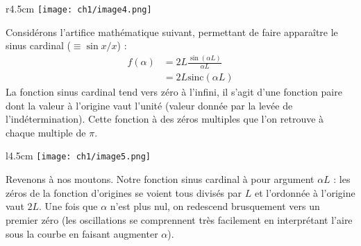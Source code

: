 \begin{wrapfigure}[8]{r}{4.5cm}
\vspace{-5mm}
\texttt{[image: ch1/image4.png]}
\end{wrapfigure}
Considérons l'artifice mathématique suivant, permettant de faire apparaître le 
sinus cardinal ($\equiv \sin x/x$) :
\begin{equation}
\begin{array}{ll}
f(\alpha) &= 2L \frac{\sin(\alpha L)}{\alpha L}\\
&= 2L\text{sinc}(\alpha L)
\end{array}
\end{equation}
La fonction sinus cardinal tend vers zéro à l'infini, il s'agit d'une fonction paire dont 
la valeur à l'origine vaut l'unité (valeur donnée par la levée de l'indétermination). Cette 
fonction à des zéros multiples que l'on retrouve à chaque multiple de $\pi$.\newpage

\begin{wrapfigure}[8]{l}{4.5cm}
\texttt{[image: ch1/image5.png]}
\end{wrapfigure}
Revenons à nos moutons. Notre fonction sinus cardinal à pour argument $\alpha L$ : les zéros 
de la fonction d'origines se voient tous divisés par $L$ et l'ordonnée à l'origine vaut $2L$. 
Une fois que $\alpha$ n'est plus nul, on redescend brusquement vers un premier zéro (les 
oscillations se comprennent très facilement en interprétant l'aire sous la courbe en faisant 
augmenter $\alpha$).\\
\ \\

